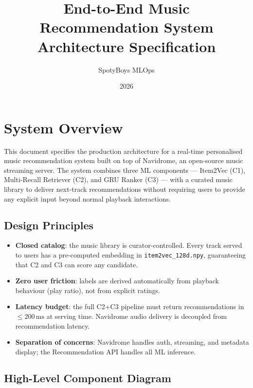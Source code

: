 \documentclass[11pt]{article}
\title{\textbf{End-to-End Music Recommendation System\\Architecture Specification}}
\author{SpotyBoys MLOps}
\date{2026}
\begin{document}
\maketitle
\tableofcontents
\newpage

\section{System Overview}

This document specifies the production architecture for a real-time personalised music
recommendation system built on top of Navidrome, an open-source music streaming server.
The system combines three ML components --- Item2Vec (C1), Multi-Recall Retriever (C2), and
GRU Ranker (C3) --- with a curated music library to deliver next-track recommendations
without requiring users to provide any explicit input beyond normal playback interactions.

\subsection{Design Principles}

\begin{itemize}[leftmargin=1.5em]
  \item \textbf{Closed catalog}: the music library is curator-controlled.  Every track served
        to users has a pre-computed embedding in \texttt{item2vec\_128d.npy}, guaranteeing that
        C2 and C3 can score any candidate.
  \item \textbf{Zero user friction}: labels are derived automatically from playback behaviour
        (play ratio), not from explicit ratings.
  \item \textbf{Latency budget}: the full C2+C3 pipeline must return recommendations in
        $\leq 200\,\text{ms}$ at serving time.  Navidrome audio delivery is decoupled from
        recommendation latency.
  \item \textbf{Separation of concerns}: Navidrome handles auth, streaming, and metadata
        display; the Recommendation API handles all ML inference.
\end{itemize}

\subsection{High-Level Component Diagram}
\end{document}
